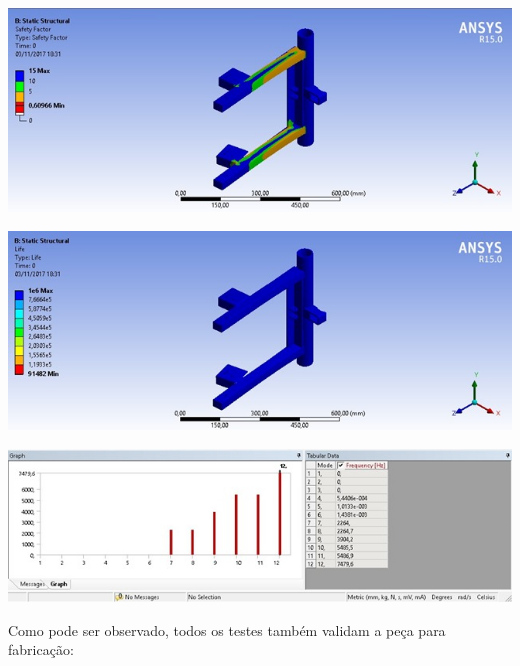     \begin{center}
    	\includegraphics[scale=0.7]{figuras/fator_seguranca_4}
        \label{fator_seguranca_4}
    \end{center}
    
    \begin{center}
    	\includegraphics[scale=0.7]{figuras/vida_util_4}
        \label{vida_util_4}
    \end{center}

    \begin{center}
    	\includegraphics[scale=0.7]{figuras/vibracao_2}
        \label{vibracao_2}
    \end{center}    

    Como pode ser observado, todos os testes também validam a peça para fabricação:
 
